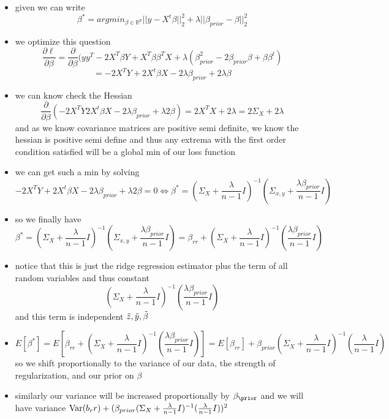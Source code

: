\documentclass[12pt,twoside]{article}
\begin{document}
\begin{enumerate}
\begin{enumerate}
   \begin{itemize}
       \color{red}
       \item  given we can write  $$\beta^{*}=argmin_{\beta\in\mathbb{R}^p}||y-X^t\beta||_{2}^{2}+\lambda||\beta_{prior}-\beta||_{2}^2$$
       \item we optimize this question $$\frac{\partial \ell}{\partial \beta}=\frac{\partial }{\partial \beta}(yy^T -2X^T\beta Y+ X^T\beta \beta^T X + \lambda(\beta_{prior}^2 -2\beta_{prior}\beta+\beta \beta^t)$$ $$=-2X^TY +2X^t\beta X-2\lambda \beta_{prior}+2\lambda \beta$$
       \item we can know check the Hessian $$\frac{\partial }{\partial \beta}(-2X^TY 2X^t\beta X-2\lambda \beta_{prior}+\lambda 2\beta)=2X^TX+2\lambda =2\Sigma_{X}+2\lambda$$ and as we know covariance matrices are positive semi definite, we know the hessian is positive semi define and thus any extrema with the first order condition satisfied will be a global min of our loss function 
       \item we can get such a min by solving $$-2X^TY +2X^t\beta X-2\lambda \beta_{prior}+\lambda 2\beta=0\iff \beta^{*}=(\Sigma_{X}+\frac{\lambda }{n-1}I)^{-1}(\Sigma_{x,y}+\frac{\lambda \beta_{prior} }{n-1} I) $$
       
   \end{itemize}


\begin{itemize}
    \color{purple}
    \item so we finally have $$\beta^{*}=(\Sigma_{X}+\frac{\lambda }{n-1}I)^{-1}(\Sigma_{x,y}+\frac{\lambda \beta_{prior} }{n-1} I)=\beta_{rr}+(\Sigma_{X}+\frac{\lambda }{n-1}I)^{-1}(\frac{\lambda \beta_{prior} }{n-1} I) $$
    \item notice that this is just the ridge regression estimator plus the term of all random variables and thus constant $$(\Sigma_{X}+\frac{\lambda }{n-1}I)^{-1}(\frac{\lambda \beta_{prior} }{n-1} I)$$ and this term is independent $\Tilde{z}, \Tilde{y}, \Tilde{\beta}$ 
    \item $$E[\beta^{*}]=E[\beta_{rr}+(\Sigma_{X}+\frac{\lambda }{n-1}I)^{-1}(\frac{\lambda \beta_{prior} }{n-1} I)]=E[\beta_{rr}]+\beta_{prior}(\Sigma_{X}+\frac{\lambda }{n-1}I)^{-1}(\frac{\lambda }{n-1} I) $$ so we shift proportionally to the variance of our data, the strength of regularization, and our prior on $\beta$
    \item similarly our variance will be increased proportionally by $\beta_{\prior}$ and we will have variance  $\var(b_rr)+(\beta_{prior}(\Sigma_{X}+\frac{\lambda }{n-1}I)^{-1}(\frac{\lambda }{n-1} I))^2$


\end{itemize}
\end{enumerate}
\end{enumerate}
\end{document}
